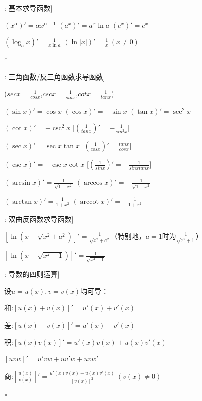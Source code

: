\documentclass[11pt,a4paper,UTF8]{ctexart}
\begin{document}
\begin{thmbox}[原理[1]: 基本求导函数]

$(x^\alpha)' = \alpha x^{\alpha-1}$	$(a^x)' = a^x \ln a$	$(e^x)' = e^x$

$(\log_a x)' = \frac{1}{x \ln a}$	$(\ln\vert{}x\vert{})' = \frac{1}{x} \ (x \neq 0)$

\textit{}*

\end{thmbox}
\begin{thmbox}[原理[2]: 三角函数/反三角函数求导函数]

($secx=\frac{1}{cosx}$,$cscx = \frac{1}{sinx}$,$cotx=\frac{1}{tanx}$)

$(\sin x)' = \cos x$	$(\cos x)' = -\sin x$	$(\tan x)' = \sec^2 x$

$(\cot x)' = -\csc^2 x$    [$(\frac{1}{tanx})'=-\frac{1}{sin^2x}$]     

$(\sec x)' = \sec x \tan x$  [$(\frac{1}{cosx})'=\frac{tanx}{cosx}$] 

$(\csc x)' = -\csc x \cot x$ [$(\frac{1}{sinx})'=-\frac{1}{sinxtanx}$]

$(\arcsin x)' = \frac{1}{\sqrt{1-x^2}}$ $(\arccos x)' = -\frac{1}{\sqrt{1-x^2}}$   

$(\arctan x)' = \frac{1}{1+x^2}$  $(\operatorname{arccot} x)' = -\frac{1}{1+x^2}$	

\textbf{}

\end{thmbox}
\begin{thmbox}[原理[3]: 双曲反函数求导函数]

$[\ln(x + \sqrt{x^2+a^2})]' = \frac{1}{\sqrt{x^2+a^2}}$（特别地，$a=1$时为$\frac{1}{\sqrt{x^2+1}}$）

$[\ln(x + \sqrt{x^2-1})]' = \frac{1}{\sqrt{x^2-1}}$

\textbf{}

\end{thmbox}
\begin{thmbox}[原理[4]: 导数的四则运算]

设$u=u(x), v=v(x)$均可导：

和:$[u(x) + v(x)]' = u'(x) + v'(x)$

差:$[u(x) - v(x)]' = u'(x) - v'(x)$

积:$[u(x)v(x)]' = u'(x)v(x) + u(x)v'(x)$

 $[uvw]' = u'vw + uv'w + uvw'$

商:$\left[\frac{u(x)}{v(x)}\right]' = \frac{u'(x)v(x) - u(x)v'(x)}{[v(x)]^2} \ (v(x) \neq 0)$

\textit{}*

\end{thmbox}
\end{document}
